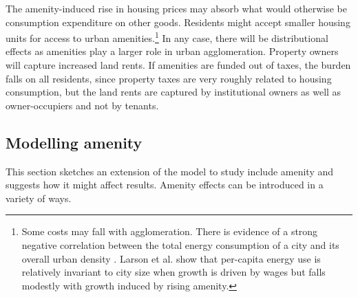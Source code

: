 The amenity-induced rise in housing prices may absorb what would otherwise be consumption expenditure on other goods. Residents might accept smaller housing units for access to urban amenities.\footnote{Some costs may fall with agglomeration. There is evidence of a strong negative correlation between the total energy consumption of a city and its overall urban density \cite{NewmanPeterJeffrey}. Larson et al. \cite{larsonEnergyImplicationsCity2015} show that per-capita energy use is relatively invariant to city size when growth is driven by wages but falls modestly with growth induced by rising amenity.} In any case, there will be distributional effects as amenities play a larger role in urban agglomeration. Property owners will capture increased land rents. If amenities are funded out of taxes, the burden falls on all residents, since property taxes are very roughly related to housing consumption, but the land rents are captured by institutional owners as well as owner-occupiers and not by tenants.



 
\subsection{Modelling amenity}

This section sketches an extension of the model to study include \gls{amenity} and suggests how it might affect results. Amenity effects can be introduced in a variety of ways. %

